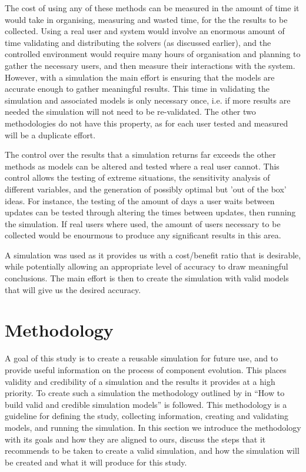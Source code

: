 The cost of using any of these methods can be measured in the amount of time it would take in organising, measuring and wasted time, for the the results to be collected.
Using a real user and system would involve an enormous amount of time validating and distributing the solvers (as discussed earlier), 
and the controlled environment would require many hours of organisation and planning to gather the necessary users, and then measure their interactions with the system.
However, with a simulation the main effort is ensuring that the models are accurate enough to gather meaningful results.
This time in validating the simulation and associated models is only necessary once, 
i.e. if more results are needed the simulation will not need to be re-validated.
The other two methodologies do not have this property, as for each user tested and measured will be a duplicate effort. 

The control over the results that a simulation returns far exceeds the other methods as models can be altered and tested where a real user cannot. 
This control allows the testing of extreme situations, the sensitivity analysis of different variables,
and the generation of possibly optimal but 'out of the box' ideas. 
For instance, the testing of the amount of days a user waits between updates can be tested through altering the times between updates, then running the simulation.
If real users where used, the amount of users necessary to be collected would be enourmous to produce any significant results in this area.

A simulation was used as it provides us with a cost/benefit ratio that is desirable, while potentially allowing an appropriate level of accuracy to draw meaningful conclusions.
The main effort is then to create the simulation with valid models that will give us the desired accuracy.

\section{Methodology}
{}A goal of this study is to create a reusable simulation for future use, and to provide useful information on the process of component evolution. 
{}This places validity and credibility of a simulation and the results it provides at a high priority.
{}To create such a simulation the methodology outlined by \cite{Law2005} in ``How to build valid and credible simulation models'' is followed.
{}This methodology is a guideline for defining the study, collecting information, creating and validating models, and running the simulation.
{}In this section we introduce the methodology with its goals and how they are aligned to ours, 
{}discuss the steps that it recommends to be taken to create a valid simulation, and how the simulation will be created and what it will produce for this study.

